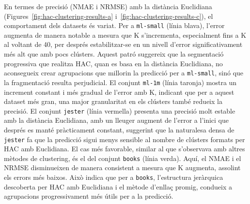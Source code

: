 \documentclass[a4paper,12pt]{report}
\begin{document}
En termes de precisió (NMAE i NRMSE) amb la distància Euclidiana (Figures~\ref{fig:hac-clustering-results-a} i~\ref{fig:hac-clustering-results-c}), el comportament dels datasets és variat. Per a \texttt{ml-small} (línia blava), l'error augmenta de manera notable a mesura que K s'incrementa, especialment fins a K al voltant de 40, per després estabilitzar-se en un nivell d'error significativament més alt que amb pocs clústers. Aquest patró suggereix que la segmentació progressiva que realitza HAC, quan es basa en la distància Euclidiana, no aconsegueix crear agrupacions que millorin la predicció per a \texttt{ml-small}, sinó que la fragmentació resulta perjudicial. El conjunt \texttt{ml-1m} (línia taronja) mostra un increment constant i més gradual de l'error amb K, indicant que per a aquest dataset més gran, una major granularitat en els clústers també redueix la precisió. El conjunt \texttt{jester} (línia vermella) presenta una precisió molt estable amb la distància Euclidiana, amb un lleuger augment de l'error a l'inici que després es manté pràcticament constant, suggerint que la naturalesa densa de \texttt{jester} fa que la predicció sigui menys sensible al nombre de clústers formats per HAC amb Euclidiana. El cas més favorable, similar al que s'observava amb altres mètodes de clustering, és el del conjunt \texttt{books} (línia verda). Aquí, el NMAE i el NRMSE disminueixen de manera consistent a mesura que K augmenta, assolint els errors més baixos. Això indica que per a \texttt{books}, l'estructura jeràrquica descoberta per HAC amb Euclidiana i el mètode d'enllaç promig, condueix a agrupacions progressivament més útils per a la predicció.
\end{document}
